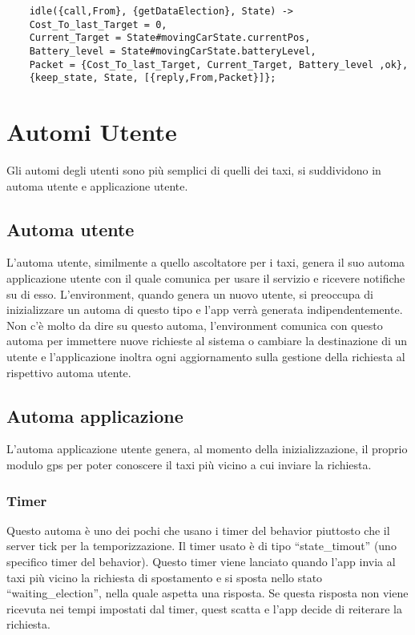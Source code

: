 \begin{lstlisting}
	idle({call,From}, {getDataElection}, State) ->
	Cost_To_last_Target = 0,
	Current_Target = State#movingCarState.currentPos,
	Battery_level = State#movingCarState.batteryLevel,
	Packet = {Cost_To_last_Target, Current_Target, Battery_level ,ok},
	{keep_state, State, [{reply,From,Packet}]};
\end{lstlisting}

\section{Automi Utente} \label{automiUtenti}
Gli automi degli utenti sono più semplici di quelli dei taxi, si suddividono in automa utente e applicazione utente. 

\subsection{Automa utente}
L'automa utente, similmente a quello ascoltatore per i taxi, genera il suo automa applicazione utente con il quale comunica per usare il servizio e ricevere notifiche su di esso. L'environment, quando genera un nuovo utente, si preoccupa di inizializzare un automa di questo tipo e l'app verrà generata indipendentemente. 
Non c'è molto da dire su questo automa, l'environment comunica con questo automa per immettere nuove richieste al sistema o cambiare la destinazione di un utente e l'applicazione inoltra ogni aggiornamento sulla gestione della richiesta al rispettivo automa utente.

\subsection{Automa applicazione}
L'automa applicazione utente genera, al momento della inizializzazione, il proprio modulo gps per poter conoscere il taxi più vicino a cui inviare la richiesta. 

\subsubsection{Timer} \label{timerAppUtente}
Questo automa è uno dei pochi che usano i timer del behavior piuttosto che il server tick per la temporizzazione. Il timer usato è di tipo ``state\_timout'' (uno specifico timer del behavior). 
Questo timer viene lanciato quando l'app invia al taxi più vicino la richiesta di spostamento e si sposta nello stato ``waiting\_election'', nella quale aspetta una risposta. Se questa risposta non viene ricevuta nei tempi impostati dal timer, quest scatta e l'app decide di reiterare la richiesta. 

